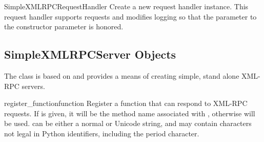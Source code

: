 \begin{classdesc}{SimpleXMLRPCRequestHandler}{}
  Create a new request handler instance.  This request handler
  supports  requests and modifies logging so that the
   parameter to the 
  constructor parameter is honored.
\end{classdesc}


\subsection{SimpleXMLRPCServer Objects \label{simple-xmlrpc-servers}}

The  class is based on
 and provides a means of creating
simple, stand alone XML-RPC servers.

\begin{methoddesc}[SimpleXMLRPCServer]{register_function}{function}
  Register a function that can respond to XML-RPC requests.  If
   is given, it will be the method name associated with
  , otherwise  will be
  used.   can be either a normal or Unicode string, and may
  contain characters not legal in Python identifiers, including the
  period character.
\end{methoddesc}

